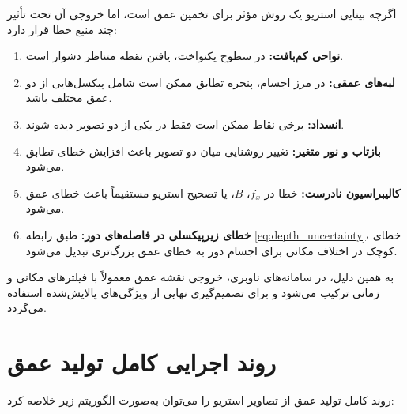 اگرچه بینایی استریو یک روش مؤثر برای تخمین عمق است، اما خروجی آن تحت تأثیر چند منبع خطا قرار دارد:

\begin{enumerate}
	\item \textbf{نواحی کم‌بافت:} در سطوح یکنواخت، یافتن نقطه متناظر دشوار است.
	\item \textbf{لبه‌های عمقی:} در مرز اجسام، پنجره تطابق ممکن است شامل پیکسل‌هایی از دو عمق مختلف باشد.
	\item \textbf{انسداد:} برخی نقاط ممکن است فقط در یکی از دو تصویر دیده شوند.
	\item \textbf{بازتاب و نور متغیر:} تغییر روشنایی میان دو تصویر باعث افزایش خطای تطابق می‌شود.
	\item \textbf{کالیبراسیون نادرست:} خطا در \(f_x\)، \(B\)، یا تصحیح استریو مستقیماً باعث خطای عمق می‌شود.
	\item \textbf{خطای زیرپیکسلی در فاصله‌های دور:} طبق رابطه \eqref{eq:depth_uncertainty}، خطای کوچک در اختلاف مکانی برای اجسام دور به خطای عمق بزرگ‌تری تبدیل می‌شود.
\end{enumerate}

به همین دلیل، در سامانه‌های ناوبری، خروجی نقشه عمق معمولاً با فیلترهای مکانی و زمانی ترکیب می‌شود و برای تصمیم‌گیری نهایی از ویژگی‌های پالایش‌شده استفاده می‌گردد.

\section{روند اجرایی کامل تولید عمق}

روند کامل تولید عمق از تصاویر استریو را می‌توان به‌صورت الگوریتم زیر خلاصه کرد:

